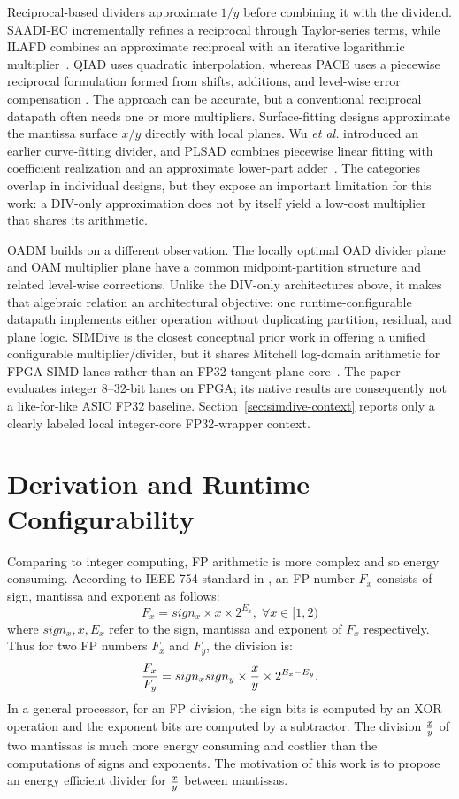 \documentclass[conference]{IEEEtran}
\begin{document}
Reciprocal-based dividers approximate $1/y$ before combining it with the
dividend. SAADI-EC incrementally refines a reciprocal through Taylor-series
terms, while ILAFD combines an approximate reciprocal with an iterative
logarithmic multiplier~\cite{melchert2019saadi,oelund2023ilafd}. QIAD uses
quadratic interpolation, whereas PACE uses a piecewise reciprocal formulation
formed from shifts, additions, and level-wise error compensation
\cite{liu2023qiad,wen2025pace}. The approach can be accurate, but a
conventional reciprocal datapath often needs one or more multipliers.
Surface-fitting designs approximate the mantissa surface $x/y$ directly with
local planes. Wu \emph{et al.} introduced an earlier curve-fitting divider,
and PLSAD combines piecewise linear fitting with coefficient realization and
an approximate lower-part adder~\cite{wu2015curve,wu2024plsad}. The categories
overlap in individual designs, but they expose an important limitation for this
work: a DIV-only approximation does not by itself yield a low-cost multiplier
that shares its arithmetic.

OADM builds on a different observation. The locally optimal OAD divider plane
and OAM multiplier plane have a common midpoint-partition structure and
related level-wise corrections. Unlike the DIV-only architectures above, it
makes that algebraic relation an architectural objective: one
runtime-configurable datapath implements either operation without duplicating
partition, residual, and plane logic. SIMDive is the closest conceptual prior
work in offering a unified configurable multiplier/divider, but it shares
Mitchell log-domain arithmetic for FPGA SIMD lanes rather than an FP32
tangent-plane core~\cite{ebrahimi2020simdive}. The paper evaluates integer
8--32-bit lanes on FPGA; its native results are consequently not a like-for-like
ASIC FP32 baseline. Section~\ref{sec:simdive-context} reports only a clearly
labeled local integer-core FP32-wrapper context.

\section{Derivation and Runtime Configurability}
Comparing to integer computing, FP arithmetic is more complex and so energy consuming. According to IEEE 754 standard in \cite{Ieee}, an FP number $F_{x} $ consists of
sign, mantissa and exponent as follows:
\[F_{x}=sign_{x}\times x\times 2^{E_{x}},\;\forall x\in [1, 2)\]
where $sign_{x}, x, E_{x}$ refer to the sign, mantissa and exponent of $F_{x}$ respectively. Thus for two FP numbers $F_{x}$ and $F_{y}$, the division is:
$${F_{x}\over F_{y}}=sign_{x}sign_{y}\times {x\over y}\times 2^{E_{x}-E_{y}}.$$
In a general processor, for an FP division, the sign bits is computed by an XOR operation and the exponent bits are computed by a subtractor. The division ${x\over y}$ of two mantissas is much more energy consuming and costlier than the computations of signs and exponents. The motivation of this work is to propose an energy efficient divider for ${x\over y}$ between mantissas.
\end{document}
